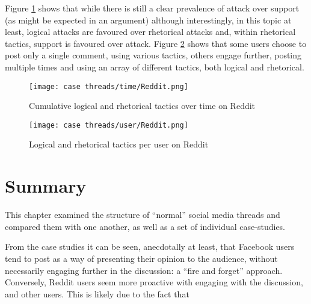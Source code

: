 Figure \ref{casegraph:time:reddit} shows that while there is still a clear prevalence of attack over support (as might be expected in an argument) although interestingly, in this topic at least, logical attacks are favoured over rhetorical attacks and, within rhetorical tactics, support is favoured over attack. Figure \ref{casegraph:user:reddit} shows that some users choose to post only a single comment, using various tactics, others engage further, posting multiple times and using an array of different tactics, both logical and rhetorical.


\begin{figure}
\centering
\texttt{[image: case threads/time/Reddit.png]}
\caption{Cumulative logical and rhetorical tactics over time on Reddit}
\label{casegraph:time:reddit}
\end{figure}

\begin{figure}
\centering
\texttt{[image: case threads/user/Reddit.png]}
\caption{Logical and rhetorical tactics per user on Reddit}
\label{casegraph:user:reddit}
\end{figure}


\section{Summary}
This chapter examined the structure of ``normal'' social media threads and compared them with one another, as well as a set of individual case-studies.



From the case studies it can be seen, anecdotally at least, that Facebook users tend to post as a way of presenting their opinion to the audience, without necessarily engaging further in the discussion: a ``fire and forget'' approach. Conversely, Reddit users seem more proactive with engaging with the discussion, and other users. This is likely due to the fact that 


